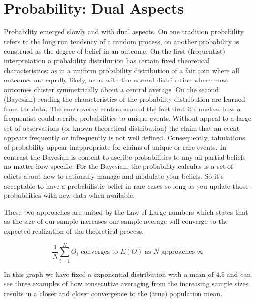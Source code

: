 \documentclass[]{tufte-book}
\theoremstyle{definition}
\theoremstyle{definition}
\theoremstyle{definition}
\theoremstyle{remark}
\begin{document}
\hypertarget{probability-dual-aspects}{%
\section{Probability: Dual Aspects}\label{probability-dual-aspects}}

Probability emerged slowly and with dual aspects. On one tradition probability refers to the long run tendency of a random process, on another probability is construed as the degree of belief in an outcome. On the first (frequentist) interpretation a probability distribution has certain fixed theoretical characteristics: as in a uniform probability distribution of a fair coin where all outcomes are equally likely, or as with the normal distribution where most outcomes cluster symmetrically about a central average. On the second (Bayesian) reading the characteristics of the probability distribution are learned from the data. The controversy centers around the fact that it's unclear how a frequentist could ascribe probabilities to unique events. Without appeal to a large set of observations (or known theoretical distribution) the claim that an event appears frequently or infrequently is not well defined. Consequently, tabulations of probability appear inappropriate for claims of unique or rare events. In contrast the Bayesian is content to ascribe probabilities to any all partial beliefs no matter how specific. For the Bayesian, the probability calculus is a set of edicts about how to rationally manage and modulate your beliefs. So it's acceptable to have a probabilistic belief in rare cases so long as you update those probabilities with new data when available.

These two approaches are united by the Law of Large numbers which states that as the size of our sample increases our sample average will converge to the expected realization of the theoretical process.

\[  \frac{1}{N} \sum_{i = 1}^{N} O_{i} \text{ converges to }  E(O) \text{ as } N \text{ approaches } \infty \]

In this graph we have fixed a exponential distribution with a mean of 4.5 and can see three examples of how consecutive averaging from the increasing sample sizes results in a closer and closer convergence to the (true) population mean.
\end{document}
